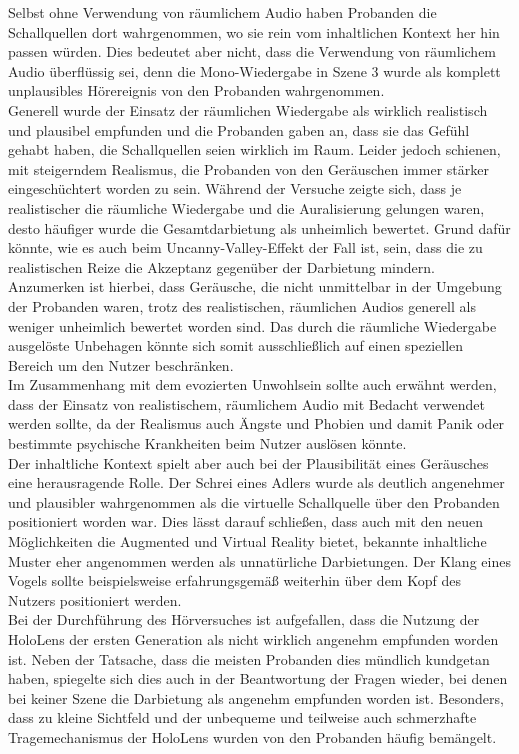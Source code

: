 Selbst ohne Verwendung von räumlichem Audio haben Probanden die Schallquellen dort wahrgenommen, wo sie rein vom inhaltlichen Kontext her hin passen würden. Dies bedeutet aber nicht, dass die Verwendung von räumlichem Audio überflüssig sei, denn die Mono-Wiedergabe in Szene 3 wurde als komplett unplausibles Hörereignis von den Probanden wahrgenommen. \\

Generell wurde der Einsatz der räumlichen Wiedergabe als wirklich realistisch und plausibel empfunden und die Probanden gaben an, dass sie das Gefühl gehabt haben, die Schallquellen seien wirklich im Raum.  Leider jedoch schienen, mit steigerndem Realismus, die Probanden von den Geräuschen immer stärker eingeschüchtert worden zu sein. Während der Versuche zeigte sich, dass je realistischer die räumliche Wiedergabe und die Auralisierung gelungen waren, desto häufiger wurde die Gesamtdarbietung als unheimlich bewertet. Grund dafür könnte, wie es auch beim \glqq Uncanny-Valley-Effekt\grqq{} der Fall ist, sein, dass die zu realistischen Reize die Akzeptanz gegenüber der Darbietung mindern. Anzumerken ist hierbei, dass Geräusche, die nicht unmittelbar in der Umgebung der Probanden waren, trotz des realistischen, räumlichen Audios generell als weniger unheimlich bewertet worden sind. Das durch die räumliche Wiedergabe ausgelöste Unbehagen könnte sich somit ausschließlich auf einen speziellen Bereich um den Nutzer beschränken.\\

Im Zusammenhang mit dem evozierten Unwohlsein sollte auch erwähnt werden, dass der Einsatz von realistischem, räumlichem Audio mit Bedacht verwendet werden sollte, da der Realismus auch Ängste und Phobien und damit Panik oder bestimmte psychische Krankheiten beim Nutzer auslösen könnte. \\

Der inhaltliche Kontext spielt aber auch bei der Plausibilität eines Geräusches eine herausragende Rolle. Der Schrei eines Adlers wurde als deutlich angenehmer und plausibler wahrgenommen als die virtuelle Schallquelle über den Probanden positioniert worden war. Dies lässt darauf schließen, dass auch mit den neuen Möglichkeiten die Augmented und Virtual Reality bietet, bekannte inhaltliche Muster eher angenommen werden als unnatürliche Darbietungen. Der Klang eines Vogels sollte beispielsweise erfahrungsgemäß weiterhin über dem Kopf des Nutzers positioniert werden.\\

Bei der Durchführung des Hörversuches ist aufgefallen, dass die Nutzung der HoloLens der ersten Generation als nicht wirklich angenehm empfunden worden ist. Neben der Tatsache, dass die meisten Probanden dies mündlich kundgetan haben, spiegelte sich dies auch in der Beantwortung der Fragen wieder, bei denen bei keiner Szene die Darbietung als angenehm empfunden worden ist. Besonders, dass zu kleine Sichtfeld und der unbequeme und teilweise auch schmerzhafte Tragemechanismus der HoloLens wurden von den Probanden häufig bemängelt. \\

